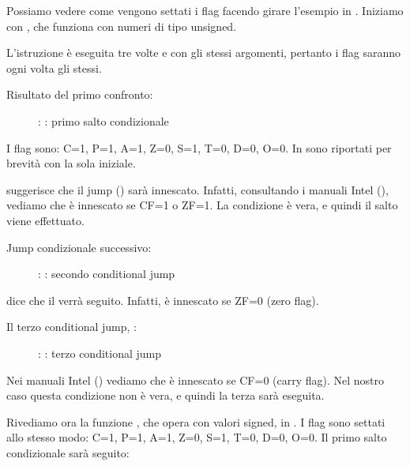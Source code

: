 \clearpage
{}
\myindex{\olly}

Possiamo vedere come vengono settati i flag facendo girare l'esempio in \olly.
Iniziamo con , che funziona con numeri di tipo unsigned.

L'istruzione \CMP è eseguita tre volte e con gli stessi argomenti, pertanto i flag saranno ogni volta gli stessi.

Risultato del primo confronto:

\begin{figure}[H]
\centering
{}
\caption{\olly: : primo salto condizionale}
\label{fig:jcc_olly_unsigned_1}
\end{figure}

I flag sono: C=1, P=1, A=1, Z=0, S=1, T=0, D=0, O=0.
In \olly sono riportati per brevità con la sola iniziale.


\olly suggerisce che il jump (\JBE) sarà innescato.
Infatti, consultando i manuali Intel (), vediamo che \JBE è innescato se CF=1 o ZF=1.
La condizione è vera, e quindi il salto viene effettuato.

\clearpage
Jump condizionale successivo:

\begin{figure}[H]
\centering
{}
\caption{\olly: : secondo conditional jump}
\label{fig:jcc_olly_unsigned_2}
\end{figure}

\olly dice che il \JNZ verrà seguito.
Infatti, \JNZ è innescato se ZF=0 (zero flag).

\clearpage
Il terzo conditional jump, \JNB:

\begin{figure}[H]
\centering
{}
\caption{\olly: : terzo conditional jump}
\label{fig:jcc_olly_unsigned_3}
\end{figure}

Nei manuali Intel () vediamo che \JNB è innescato se CF=0 (carry flag).
Nel nostro caso questa condizione non è vera, e quindi la terza \printf sarà eseguita.

\clearpage
Rivediamo ora la funzione , che opera con valori signed, in \olly.
I flag sono settati allo stesso modo: C=1, P=1, A=1, Z=0, S=1, T=0, D=0, O=0.
Il primo salto condizionale \JLE sarà seguito:

